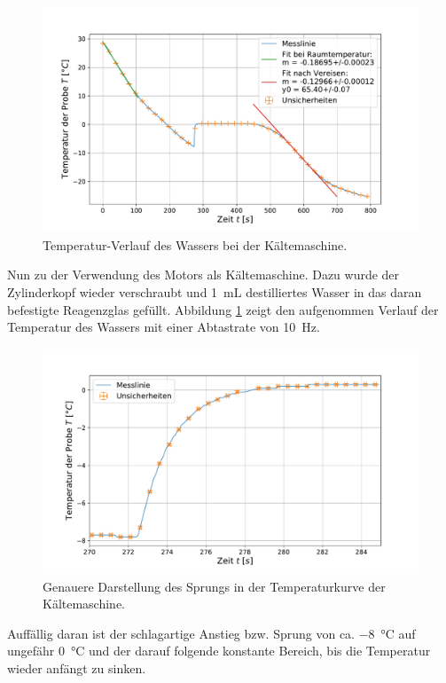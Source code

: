 	\begin{figure}[ht]
		\centering
		\includegraphics[width=\textwidth]{data/kalt_machen.pdf}
		\caption{Temperatur-Verlauf des Wassers bei der Kältemaschine.}
		\label{fig:Kältemaschine}	
	\end{figure}
	Nun zu der Verwendung des Motors als Kältemaschine.
	Dazu wurde der Zylinderkopf wieder verschraubt und \SI{1}{\milli\liter} destilliertes Wasser in das daran befestigte Reagenzglas gefüllt.
	Abbildung \ref{fig:Kältemaschine} zeigt den aufgenommen Verlauf der Temperatur des Wassers mit einer Abtastrate von \SI{10}{\hertz}.
	\begin{figure}[ht]
		\centering
		\includegraphics[width=\textwidth]{data/kalt_sprung.pdf}
		\caption{Genauere Darstellung des Sprungs in der Temperaturkurve der Kältemaschine.}
		\label{fig:KaltSprung}	
	\end{figure} 
	Auffällig daran ist der schlagartige Anstieg bzw. Sprung von ca. \SI{-8}{\celsius} auf ungefähr \SI{0}{\celsius} und der darauf folgende konstante Bereich, bis die Temperatur wieder anfängt zu sinken.
